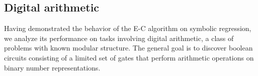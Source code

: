 \documentclass{article}
\begin{document}
\subsection{Digital arithmetic}
Having demonstrated the behavior of the E-C algorithm on symbolic
regression, we analyze its performance on tasks involving digital
arithmetic, a class of problems with known modular structure. The
general goal is to discover boolean circuits consisting of a limited
set of gates that perform arithmetic operations on binary number
representations. 




\nocite{*}
\end{document}
